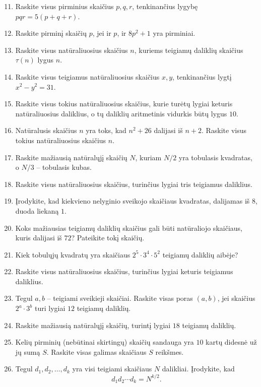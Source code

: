 \documentclass[11pt,a4paper]{scrartcl}
\begin{document}
\begin{enumerate}
    \setcounter{enumi}{10}
    \item Raskite visus pirminius skaičius \(p,q,r\), tenkinančius lygybę \(pqr=5(p+q+r)\).
    \item Raskite pirminį skaičių \(p\), jei ir \(p\), ir \(8p^2+1\) yra pirminiai.
    \item Raskite visus natūraliuosius skaičius \(n\), kuriems teigiamų daliklių skaičius \(\tau(n)\) lygus \(n\).
    \item Raskite visus teigiamus natūraliuosius skaičius \(x,y\), tenkinančius lygtį \(x^2-y^2=31\).
    \item Raskite visus tokius natūraliuosius skaičius, kurie turėtų lygiai keturis natūraliuosius daliklius, o tų daliklių aritmetinis vidurkis būtų lygus $10$.
    \item Natūralusis skaičius \(n\) yra toks, kad \(n^2+26\) dalijasi iš \(n+2\). Raskite visus tokius natūraliuosius skaičius \(n\).
    \item Raskite mažiausią natūralųjį skaičių \(N\), kuriam \(N/2\) yra tobulasis kvadratas, o \(N/3\) – tobulasis kubas.
    \item Raskite visus natūraliuosius skaičius, turinčius lygiai tris teigiamus daliklius.
    \item Įrodykite, kad kiekvieno nelyginio sveikojo skaičiaus kvadratas, dalijamas iš $8$, duoda liekaną $1$.
    \item Koks mažiausias teigiamų daliklių skaičius gali būti natūraliojo skaičiaus, kuris dalijasi iš $72$? Pateikite tokį skaičių.
\end{enumerate}

\begin{enumerate}
    \setcounter{enumi}{20}
    \item Kiek tobulųjų kvadratų yra skaičiaus \(2^5\cdot3^4\cdot5^2\) teigiamų daliklių aibėje?
    \item Raskite visus natūraliuosius skaičius, turinčius lygiai keturis teigiamus daliklius.
    \item Tegul \(a,b\) – teigiami sveikieji skaičiai. Raskite visas poras \((a,b)\), jei skaičius \(2^a\cdot3^b\) turi lygiai $12$ teigiamų daliklių.
    \item Raskite mažiausią natūralųjį skaičių, turintį lygiai $18$ teigiamų daliklių.
    \item Kelių pirminių (nebūtinai skirtingų) skaičių sandauga yra $10$ kartų didesnė už jų sumą \(S\). Raskite visas galimas skaičiaus \(S\) reikšmes.
    \item  Tegul \(d_1,d_2,\ldots,d_k\) yra visi teigiami skaičiaus \(N\) dalikliai. Įrodykite, kad
    \begin{equation*}
        d_1d_2\cdots d_k=N^{k/2}.
    \end{equation*}
\end{enumerate}
\end{document}
